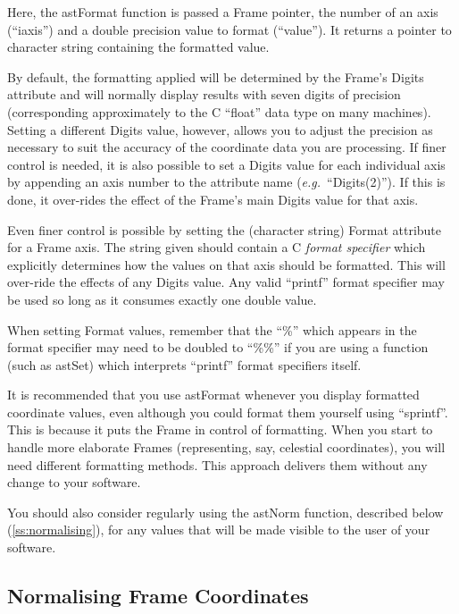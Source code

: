 \documentclass[twoside,11pt]{article}
\newcommand{\htmlref}[2]{#1}
\newcommand{\secref}[1]{\S\ref{#1}}
\renewcommand{\secref}[1]{\ref{#1}}
\begin{document}
Here, the astFormat function is passed a Frame pointer, the number of
an axis (``iaxis'') and a double precision value to format
(``value''). It returns a pointer to character string containing the
formatted value.
\label{ss:formattingwithdigits}

By default, the formatting applied will be determined by the Frame's
Digits attribute and will normally display results with seven digits
of precision (corresponding approximately to the C ``float'' data type
on many machines). Setting a different Digits value, however, allows
you to adjust the precision as necessary to suit the accuracy of the
coordinate data you are processing.  If finer control is needed, it is
also possible to set a Digits value for each individual axis by
appending an axis number to the attribute name
({\em{e.g.}}\ ``Digits(2)''). If this is done, it over-rides the
effect of the Frame's main Digits value for that axis.

Even finer control is possible by setting the (character string)
Format attribute for a Frame axis. The string given should contain a C
{\em{format specifier}} which explicitly determines how the values on
that axis should be formatted. This will over-ride the effects of any
Digits value. Any valid ``printf'' format specifier may be used so
long as it consumes exactly one double value.

When setting Format values, remember that the ``\%'' which appears in
the format specifier may need to be doubled to ``\%\%'' if you are
using a function (such as \htmlref{astSet}{astSet}) which interprets ``printf'' format
specifiers itself.

It is recommended that you use astFormat whenever you display
formatted coordinate values, even although you could format them
yourself using ``sprintf''. This is because it puts the Frame in
control of formatting. When you start to handle more elaborate Frames
(representing, say, celestial coordinates), you will need different
formatting methods. This approach delivers them without any change to
your software.

You should also consider regularly using the \htmlref{astNorm}{astNorm} function,
described below (\secref{ss:normalising}), for any values that will be
made visible to the user of your software.

\subsection{\label{ss:normalising}Normalising Frame Coordinates}
\end{document}
